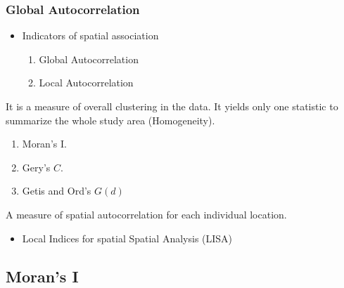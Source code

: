 \documentclass[english,10pt]{beamer}\usepackage[]{graphicx}\usepackage[]{xcolor}
\begin{document}
\begin{frame}
  \frametitle{Global Autocorrelation}
    \begin{itemize}
      \item Indicators of spatial association
        \begin{enumerate}
          \item Global Autocorrelation
          \item Local Autocorrelation
        \end{enumerate}
    \end{itemize}
    \begin{definition}
      It is a measure of overall clustering in the data. It yields only one statistic to summarize the whole study area (Homogeneity).
        \begin{enumerate}
          \item Moran's I.
          \item Gery's $C$.
          \item Getis and Ord's $G(d)$
        \end{enumerate}
    \end{definition}
        \begin{definition}
        A measure of spatial autocorrelation for each individual location.
          \begin{itemize}
            \item Local Indices for spatial Spatial Analysis (LISA)
          \end{itemize}
    \end{definition}
\end{frame}

\subsection{Moran's I}
\end{document}
